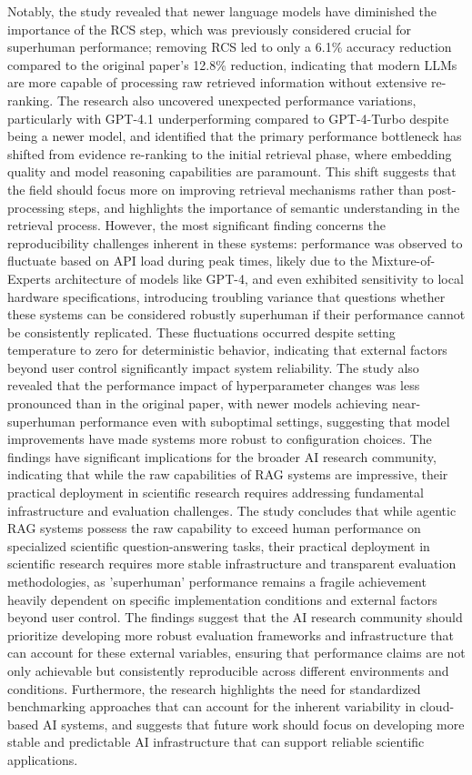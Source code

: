 \documentclass[12pt,a4paper]{article}
\begin{document}
Notably, the study revealed that newer language models have diminished the importance of the RCS step, which was previously considered crucial for superhuman performance; removing RCS led to only a 6.1\% accuracy reduction compared to the original paper's 12.8\% reduction, indicating that modern LLMs are more capable of processing raw retrieved information without extensive re-ranking. The research also uncovered unexpected performance variations, particularly with GPT-4.1 underperforming compared to GPT-4-Turbo despite being a newer model, and identified that the primary performance bottleneck has shifted from evidence re-ranking to the initial retrieval phase, where embedding quality and model reasoning capabilities are paramount. This shift suggests that the field should focus more on improving retrieval mechanisms rather than post-processing steps, and highlights the importance of semantic understanding in the retrieval process. However, the most significant finding concerns the reproducibility challenges inherent in these systems: performance was observed to fluctuate based on API load during peak times, likely due to the Mixture-of-Experts architecture of models like GPT-4, and even exhibited sensitivity to local hardware specifications, introducing troubling variance that questions whether these systems can be considered robustly superhuman if their performance cannot be consistently replicated. These fluctuations occurred despite setting temperature to zero for deterministic behavior, indicating that external factors beyond user control significantly impact system reliability. The study also revealed that the performance impact of hyperparameter changes was less pronounced than in the original paper, with newer models achieving near-superhuman performance even with suboptimal settings, suggesting that model improvements have made systems more robust to configuration choices. The findings have significant implications for the broader AI research community, indicating that while the raw capabilities of RAG systems are impressive, their practical deployment in scientific research requires addressing fundamental infrastructure and evaluation challenges. The study concludes that while agentic RAG systems possess the raw capability to exceed human performance on specialized scientific question-answering tasks, their practical deployment in scientific research requires more stable infrastructure and transparent evaluation methodologies, as 'superhuman' performance remains a fragile achievement heavily dependent on specific implementation conditions and external factors beyond user control. The findings suggest that the AI research community should prioritize developing more robust evaluation frameworks and infrastructure that can account for these external variables, ensuring that performance claims are not only achievable but consistently reproducible across different environments and conditions. Furthermore, the research highlights the need for standardized benchmarking approaches that can account for the inherent variability in cloud-based AI systems, and suggests that future work should focus on developing more stable and predictable AI infrastructure that can support reliable scientific applications.
\end{document}
